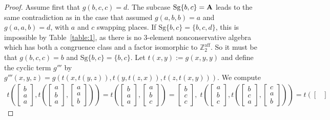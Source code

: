 \documentclass[10pt,a4paper]{amsart}
\newcommand{\m}[1]{\mathbf{\uppercase{#1}}}
\begin{document}
\begin{proof}
Assume first that $g(b,c,c)=d$. The subcase $\mathrm{Sg}\{b,c\}=\m a$ leads to the same contradiction as in the case that assumed $g(a,b,b)=a$ and $g(a,a,b)=d$, with $a$ and $c$ swapping places. If $\mathrm{Sg}\{b,c\}=\{b,c,d\}$, this is impossible by Table~\ref{table:1}, as there is no 3-element nonconservative algebra which has both a congruence class and a factor isomorphic to $\mathbb{Z}^{\text{aff}}_2$. So it must be that $g(b,c,c)=b$ and $\mathrm{Sg}\{b,c\}=\{b,c\}$. Let $t(x,y):=g(x,y,y)$ and define the cyclic term $g'''$ by $g'''(x,y,z)=g(t(x,t(y,z)),t(y,t(z,x)),t(z,t(x,y))).$ We compute 
$$
\begin{gathered}
t\left(
\begin{bmatrix}
b \\
a \\
a
\end{bmatrix}\!,
t\left(
\begin{bmatrix}
a \\
b \\
a
\end{bmatrix}\!,\!
\begin{bmatrix}
a \\
a \\
b
\end{bmatrix}
\right)\right)=t\left(
\begin{bmatrix}
b \\
a \\
a
\end{bmatrix}\!,\!
\begin{bmatrix}
a \\
b \\
c
\end{bmatrix}
\right)=
\begin{bmatrix}
b \\
c \\
c
\end{bmatrix},
\;
t\left(
\begin{bmatrix}
a \\
b \\
c
\end{bmatrix}\!,
t\left(
\begin{bmatrix}
b \\
c \\
a
\end{bmatrix}\!,\!
\begin{bmatrix}
c \\
a \\
b
\end{bmatrix}
\right)\right)=t\left(
\begin{bmatrix}

\end{bmatrix}
\end{gathered}$$
\end{proof}
\end{document}
